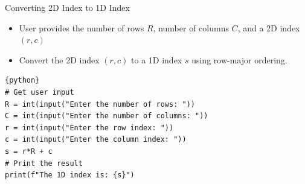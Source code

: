\documentclass{beamer}
\begin{document}
\begin{frame}[fragile]{Converting 2D Index to 1D Index}
    \begin{itemize}
        \item User provides the number of rows \(R\), number of columns \(C\), and a 2D index \((r, c)\)
        \item Convert the 2D index \((r, c)\) to a 1D index \(s\) using row-major ordering.
    \end{itemize}
    \begin{lstlisting}{python}
# Get user input
R = int(input("Enter the number of rows: "))
C = int(input("Enter the number of columns: "))
r = int(input("Enter the row index: "))
c = int(input("Enter the column index: "))
s = r*R + c
# Print the result
print(f"The 1D index is: {s}")
    \end{lstlisting}
\end{frame}
\end{document}
